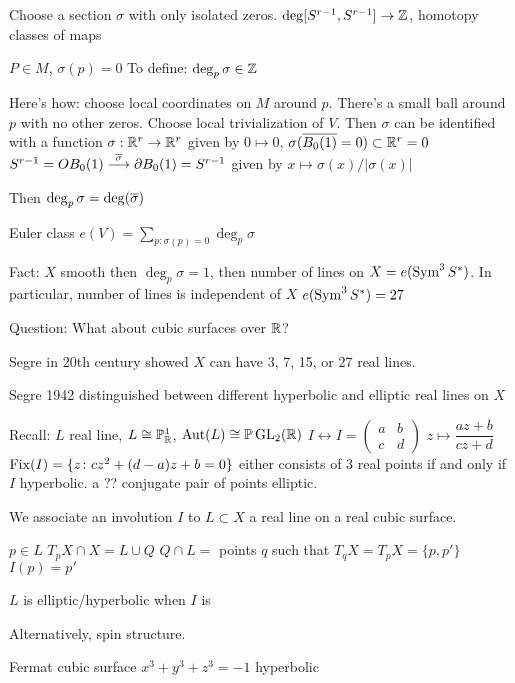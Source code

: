 Choose a section $\sigma$ with only isolated zeros.
$\deg [S^{r-1},S^{r-1}] \to \mathbb{Z}$, homotopy classes of maps

$P \in M$, $\sigma(p)=0$
To define: $\deg_p \sigma \in \mathbb{Z}$

Here's how: choose local coordinates on $M$ around $p$. There's a small ball around $p$ with no other zeros. Choose local trivialization of $V$. Then $\sigma$ can be identified with a function $\sigma: \mathbb{R}^r \to \mathbb{R}^r$ given by $0 \mapsto 0$, $\sigma(\overline{B_0(1)}=0) \subset \mathbb{R}^r=0$
$S^{r-1}= OB_0(1) \stackrel{\overline{\sigma}}{\longrightarrow} \partial B_0(1)= S^{r-1}$ given by $x \mapsto \sigma(x)/|\sigma(x)|$


Then $\deg_p \sigma= \deg(\overline{\sigma})$

Euler class 
$e(V)= \sum_{p: \sigma(p)=0} \deg_p \sigma$

Fact: $X$ smooth then $\deg_p \sigma=1$, then number of lines on $X= e(\operatorname{Sym}^3S^*)$. In particular, number of lines is independent of $X$
$e(\operatorname{Sym}^3S^*)=27$


Question: What about cubic surfaces over $\mathbb{R}$?

Segre in 20th century showed $X$ can have 3, 7, 15, or 27 real lines.


Segre 1942 distinguished between different hyperbolic and elliptic real lines on $X$

Recall: $L$ real line, $L \cong \mathbb{P}_{\mathbb{R}}^1$, $\operatorname{Aut}(L) \cong \mathbb{P} \operatorname{GL}_2(\mathbb{R})$
$I \leftrightarrow I = \begin{pmatrix} a & b \\ c & d \end{pmatrix}$
$z \mapsto \dfrac{az+b}{cz+d}$
$\operatorname{Fix}(I)= \{z \colon cz^2+(d-a)z+b=0\}$
either consists of 3 real points if and only if $I$ hyperbolic. a ?? conjugate pair of points elliptic.


We associate an involution $I$ to $L \subset X$ a real line on a real cubic surface.

$p \in L$
$T_p X \cap X= L \cup Q$
$Q \cap L=$ points $q$ such that $T_qX= T_pX= \{p,p'\}$
$I(p)= p'$

\begin{dfn}
$L$ is elliptic/hyperbolic when $I$ is 
\end{dfn}

Alternatively, spin structure.


\begin{ex}
Fermat cubic surface $x^3+y^3+z^3= -1$
hyperbolic
\end{ex}


